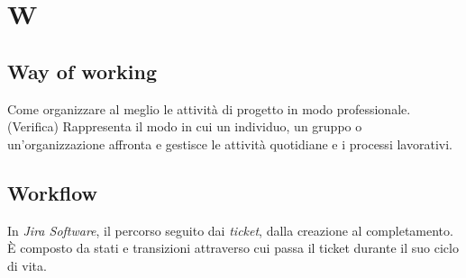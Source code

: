 \chapter{W}

\section{Way of working}\label{sec:WoW}
Come organizzare al meglio le attività di progetto in modo professionale.
(Verifica) Rappresenta il modo in cui un individuo, un gruppo o un'organizzazione affronta e gestisce le attività quotidiane e i processi lavorativi. 

\section{Workflow}
In \emph{Jira Software}, il percorso seguito dai \emph{ticket}, dalla creazione al completamento. È composto da stati e transizioni attraverso cui passa il ticket durante il suo ciclo di vita.

